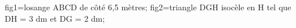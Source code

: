 \documentclass[exercice]{thedocument}%
\begin{document}
%
    \>fig1=losange ABCD de côté 6,5 mètres;%
    \>fig2=triangle DGH isocèle en H tel que DH = 3 dm et DG = 2 dm;%
\end{document}

